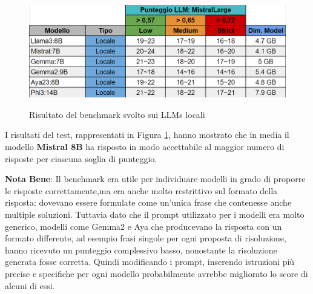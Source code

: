 \begin{figure}[H]
    \centering
    \includegraphics[alt={Tabella con risultati del benchmark sui LLM locali}, width=1\columnwidth]{img/benchmarkLLMlocali.png}
    \caption{Risultato del benchmark svolto sui LLMs locali}
    \label{fig:results_local_llms}
\end{figure}

I risultati del test, rappresentati in Figura \ref{fig:results_local_llms}, hanno mostrato che in media il modello \textbf{Mistral 8B} ha risposto in modo accettabile al maggior numero di risposte per ciascuna soglia di punteggio. 

\textcolor{notaBeneBlue}{\textbf{Nota Bene}: Il benchmark era utile per individuare 
modelli in grado di proporre le risposte correttamente,ma era anche molto restrittivo sul 
formato della risposta: dovevano essere formulate come un’unica frase che contenesse anche
multiple soluzioni. Tuttavia dato che il prompt utilizzato per i modelli era molto 
generico, modelli come Gemma2 e Aya che producevano la risposta con un formato differente, 
ad esempio frasi singole per ogni proposta di risoluzione, hanno ricevuto un punteggio 
complessivo basso, nonostante la risoluzione generata fosse corretta. 
Quindi modificando i prompt, inserendo istruzioni più precise e specifiche per ogni modello probabilmente avrebbe migliorato lo score di alcuni di essi.\\}

